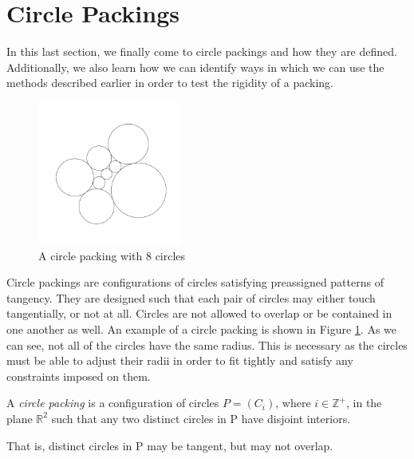 
\section{Circle Packings}

\begin{flushleft}
 In this last section, we finally come to circle packings and how they are defined. Additionally, we also learn how we can identify ways in which we can use the methods described earlier in order to test the rigidity of a packing. 
\end{flushleft}

\begin{figure}[htbp]
    \centering
    \includegraphics[width = 0.42\textwidth]{Chapter 3/7. Plain packing.png}
    \caption{A circle packing with 8 circles}
    \label{fig: circle packing example}
\end{figure}
\vspace{-4 mm}
\begin{flushleft}
Circle packings are configurations of circles satisfying preassigned patterns of tangency. They are designed such that each pair of circles may either touch tangentially, or not at all. Circles are not allowed to overlap or be contained in one another as well. An example of a circle packing is shown in Figure \ref{fig: circle packing example}. As we can see, not all of the circles have the same radius. This is necessary as the circles must be able to adjust their radii in order to fit tightly and satisfy any constraints imposed on them.
\end{flushleft}

\begin{definition}
A \textit{circle packing} is a configuration of circles $P = (C_i)$, where $i \in \mathbb{Z}^+$, in the plane $\mathbb{R}^2$ such that any
two distinct circles in P have disjoint interiors. 

\noindent
That is, distinct circles in P may be tangent, but may not overlap.
\end{definition}

